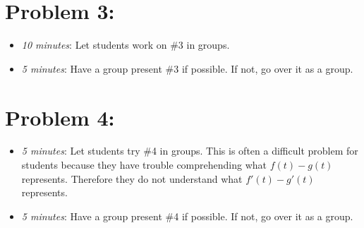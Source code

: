 \documentclass[handout,nooutcomes]{ximera}
\begin{document}
	
	
\section*{Problem 3:}

	\begin{itemize}
	
	\item  \emph{10 minutes}:  Let students work on \#3 in groups.
	
	\item  \emph{5 minutes}:  Have a group present \#3 if possible.  If not, go over it as a group.
	
	\end{itemize}
	


\section*{Problem 4:}

	\begin{itemize}
	
	\item  \emph{5 minutes}:  Let students try \#4 in groups.  This is often a difficult problem for students because they have trouble comprehending what $f(t)-g(t)$ represents.  Therefore they do not understand what $f'(t)-g'(t)$ represents.
		
	\item  \emph{5 minutes}:  Have a group present \#4 if possible.  If not, go over it as a group.
	\end{itemize}	
	
	
	

	
	

	
	
	

	
	
	
\end{document}
